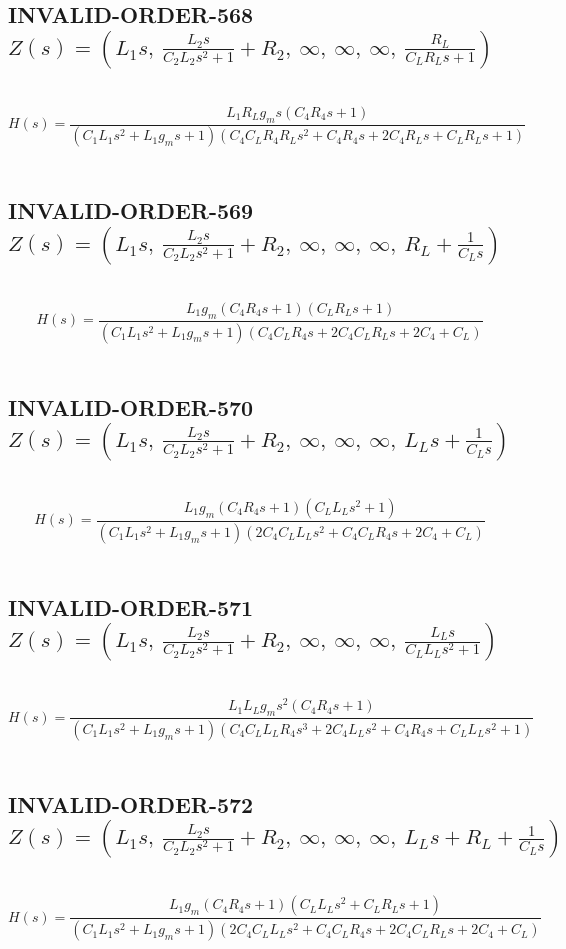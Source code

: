\documentclass{article}
\begin{document}
\subsection{INVALID-ORDER-568 $Z(s) = \left( L_{1} s, \  \frac{L_{2} s}{C_{2} L_{2} s^{2} + 1} + R_{2}, \  \infty, \  \infty, \  \infty, \  \frac{R_{L}}{C_{L} R_{L} s + 1}\right)$ } \ 
\textbf{\[H(s) = \frac{L_{1} R_{L} g_{m} s \left(C_{4} R_{4} s + 1\right)}{\left(C_{1} L_{1} s^{2} + L_{1} g_{m} s + 1\right) \left(C_{4} C_{L} R_{4} R_{L} s^{2} + C_{4} R_{4} s + 2 C_{4} R_{L} s + C_{L} R_{L} s + 1\right)}\] } \ 
\subsection{INVALID-ORDER-569 $Z(s) = \left( L_{1} s, \  \frac{L_{2} s}{C_{2} L_{2} s^{2} + 1} + R_{2}, \  \infty, \  \infty, \  \infty, \  R_{L} + \frac{1}{C_{L} s}\right)$ } \ 
\textbf{\[H(s) = \frac{L_{1} g_{m} \left(C_{4} R_{4} s + 1\right) \left(C_{L} R_{L} s + 1\right)}{\left(C_{1} L_{1} s^{2} + L_{1} g_{m} s + 1\right) \left(C_{4} C_{L} R_{4} s + 2 C_{4} C_{L} R_{L} s + 2 C_{4} + C_{L}\right)}\] } \ 
\subsection{INVALID-ORDER-570 $Z(s) = \left( L_{1} s, \  \frac{L_{2} s}{C_{2} L_{2} s^{2} + 1} + R_{2}, \  \infty, \  \infty, \  \infty, \  L_{L} s + \frac{1}{C_{L} s}\right)$ } \ 
\textbf{\[H(s) = \frac{L_{1} g_{m} \left(C_{4} R_{4} s + 1\right) \left(C_{L} L_{L} s^{2} + 1\right)}{\left(C_{1} L_{1} s^{2} + L_{1} g_{m} s + 1\right) \left(2 C_{4} C_{L} L_{L} s^{2} + C_{4} C_{L} R_{4} s + 2 C_{4} + C_{L}\right)}\] } \ 
\subsection{INVALID-ORDER-571 $Z(s) = \left( L_{1} s, \  \frac{L_{2} s}{C_{2} L_{2} s^{2} + 1} + R_{2}, \  \infty, \  \infty, \  \infty, \  \frac{L_{L} s}{C_{L} L_{L} s^{2} + 1}\right)$ } \ 
\textbf{\[H(s) = \frac{L_{1} L_{L} g_{m} s^{2} \left(C_{4} R_{4} s + 1\right)}{\left(C_{1} L_{1} s^{2} + L_{1} g_{m} s + 1\right) \left(C_{4} C_{L} L_{L} R_{4} s^{3} + 2 C_{4} L_{L} s^{2} + C_{4} R_{4} s + C_{L} L_{L} s^{2} + 1\right)}\] } \ 
\subsection{INVALID-ORDER-572 $Z(s) = \left( L_{1} s, \  \frac{L_{2} s}{C_{2} L_{2} s^{2} + 1} + R_{2}, \  \infty, \  \infty, \  \infty, \  L_{L} s + R_{L} + \frac{1}{C_{L} s}\right)$ } \ 
\textbf{\[H(s) = \frac{L_{1} g_{m} \left(C_{4} R_{4} s + 1\right) \left(C_{L} L_{L} s^{2} + C_{L} R_{L} s + 1\right)}{\left(C_{1} L_{1} s^{2} + L_{1} g_{m} s + 1\right) \left(2 C_{4} C_{L} L_{L} s^{2} + C_{4} C_{L} R_{4} s + 2 C_{4} C_{L} R_{L} s + 2 C_{4} + C_{L}\right)}\] } \ 
\end{document}

